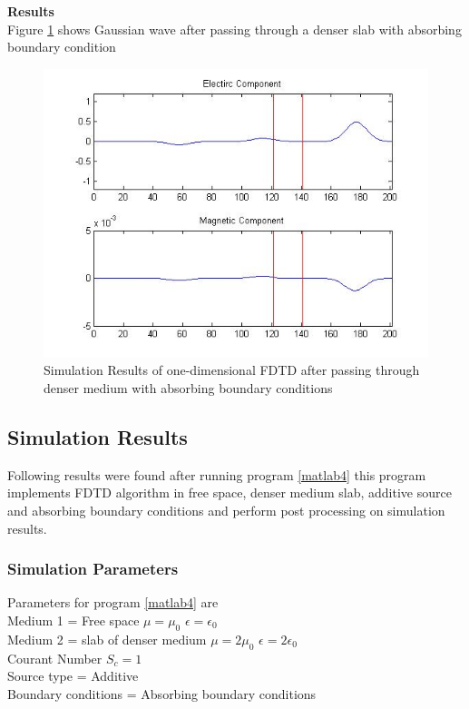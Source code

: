 \textbf{Results}\\
Figure \ref{fig:abc} shows Gaussian wave after passing through a denser slab with absorbing boundary condition
\begin{figure}[htbp]
	\centering
		\includegraphics[width=5in]{Figures/abc.jpg}
	\caption[Simulation Result of 1 dimensional FDTD after passing through denser medium]{Simulation Results of one-dimensional FDTD after passing through denser medium with absorbing boundary conditions}
	\label{fig:abc}
\end{figure}

\subsection{Simulation Results}
Following results were found after running program \ref{matlab4}
 this program implements FDTD algorithm in free space, denser medium slab, additive source and absorbing boundary conditions and perform post processing on simulation results.
\subsubsection{Simulation Parameters}
Parameters for program  \ref{matlab4}
are \\
Medium 1 = Free space  $\mu=\mu_0$  $\epsilon=\epsilon_0$\\
Medium 2 = slab of denser medium $\mu=2\mu_0$  $\epsilon=2\epsilon_0$\\
Courant Number $S_c=1$\\
Source type = Additive\\
Boundary conditions = Absorbing boundary conditions

